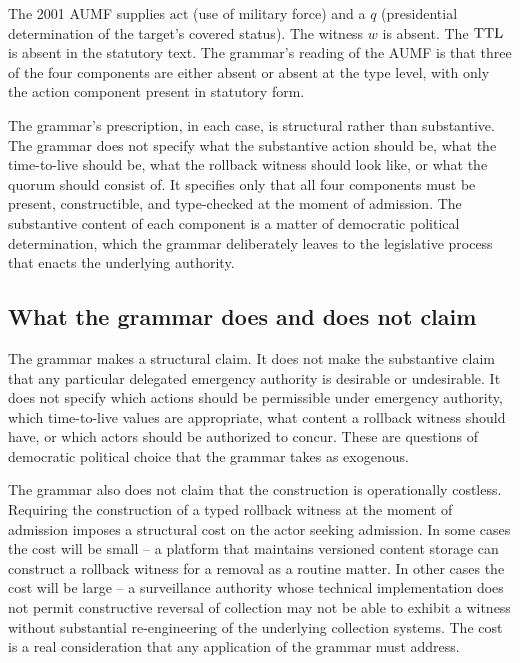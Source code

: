 The 2001 AUMF supplies $\text{act}$ (use of military force) and a $q$ (presidential determination of the
target's covered status).
The witness $w$ is absent.
The $\mathrm{TTL}$ is absent in the statutory text.
The grammar's reading of the AUMF is that three of the four components are either absent or absent at the
type level, with only the action component present in statutory form.

The grammar's prescription, in each case, is structural rather than substantive.
The grammar does not specify what the substantive action should be, what the time-to-live should be,
what the rollback witness should look like, or what the quorum should consist of.
It specifies only that all four components must be present, constructible, and type-checked at the moment
of admission.
The substantive content of each component is a matter of democratic political determination,
which the grammar deliberately leaves to the legislative process that enacts the underlying authority.

\subsection{What the grammar does and does not claim}

The grammar makes a structural claim.
It does not make the substantive claim that any particular delegated emergency authority is desirable or undesirable.
It does not specify which actions should be permissible under emergency authority,
which time-to-live values are appropriate, what content a rollback witness should have, or which actors should
be authorized to concur.
These are questions of democratic political choice that the grammar takes as exogenous.

The grammar also does not claim that the construction is operationally costless.
Requiring the construction of a typed rollback witness at the moment of admission imposes a structural cost
on the actor seeking admission.
In some cases the cost will be small -- a platform that maintains versioned content storage can construct
a rollback witness for a removal as a routine matter.
In other cases the cost will be large -- a surveillance authority whose technical implementation does not
permit constructive reversal of collection may not be able to exhibit a witness without substantial re-engineering
of the underlying collection systems.
The cost is a real consideration that any application of the grammar must address.

